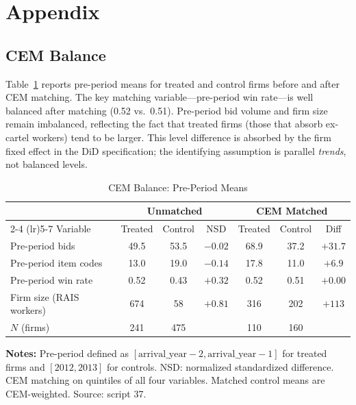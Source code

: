\clearpage
\appendix
\setcounter{table}{0}
\setcounter{figure}{0}
\renewcommand{\thetable}{A.\arabic{table}}
\renewcommand{\thefigure}{A.\arabic{figure}}

\section{Appendix}\label{app}

\subsection{CEM Balance}\label{app:balance}

Table~\ref{tab:balance} reports pre-period means for treated and control firms before and after CEM matching. The key matching variable---pre-period win rate---is well balanced after matching (0.52 vs.\ 0.51). Pre-period bid volume and firm size remain imbalanced, reflecting the fact that treated firms (those that absorb ex-cartel workers) tend to be larger. This level difference is absorbed by the firm fixed effect in the DiD specification; the identifying assumption is parallel \emph{trends}, not balanced levels.

\begin{table}[htbp]
\centering
\caption{CEM Balance: Pre-Period Means}\label{tab:balance}
\begin{tabular}{lcccccc}
\toprule
& \multicolumn{3}{c}{Unmatched} & \multicolumn{3}{c}{CEM Matched} \\
\cmidrule(lr){2-4} \cmidrule(lr){5-7}
Variable & Treated & Control & NSD & Treated & Control & Diff \\
\midrule
Pre-period bids & 49.5 & 53.5 & $-0.02$ & 68.9 & 37.2 & $+31.7$ \\
Pre-period item codes & 13.0 & 19.0 & $-0.14$ & 17.8 & 11.0 & $+6.9$ \\
Pre-period win rate & 0.52 & 0.43 & $+0.32$ & 0.52 & 0.51 & $+0.00$ \\
Firm size (RAIS workers) & 674 & 58 & $+0.81$ & 316 & 202 & $+113$ \\[3pt]
$N$ (firms) & 241 & 475 & & 110 & 160 & \\
\bottomrule
\end{tabular}
\vspace{0.5em}
\begin{minipage}{0.90\textwidth}
\scriptsize{\textbf{Notes:} Pre-period defined as $[\text{arrival\_year} - 2, \text{arrival\_year} - 1]$ for treated firms and $[2012, 2013]$ for controls. NSD: normalized standardized difference. CEM matching on quintiles of all four variables. Matched control means are CEM-weighted. Source: script 37.\par}
\end{minipage}
\end{table}

